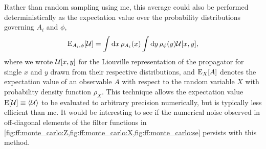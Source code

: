 Rather than random sampling using \gls{mc}, this average could also be performed deterministically as the expectation value over the probability distributions governing $A_i$ and $\phi$,
\begin{equation}
    \operatorname{E}_{A_i,\phi}[\mathcal{U}] = \int\dd{x}\rho_{A_i}(x)\int\dd{y}\rho_{\phi}(y)\mathcal{U}[x, y],
\end{equation}
where we wrote $\mathcal{U}[x, y]$ for the Liouville representation of the propagator for single $x$ and $y$ drawn from their respective distributions, and $\operatorname{E}_X[A]$ denotes the expectation value of an observable $A$ with respect to the random variable $X$ with probability density function $\rho_X$.
This technique allows the expectation value $\expectation[\liouvU]\equiv\ev{\liouvU}$ to be evaluated to arbitrary precision numerically, but is typically less efficient than \gls{mc}.
It would be interesting to see if the numerical noise observed in off-diagonal elements of the filter functions in \cref{fig:ff:monte_carlo:Z,fig:ff:monte_carlo:X,fig:ff:monte_carlo:se} persists with this method.
